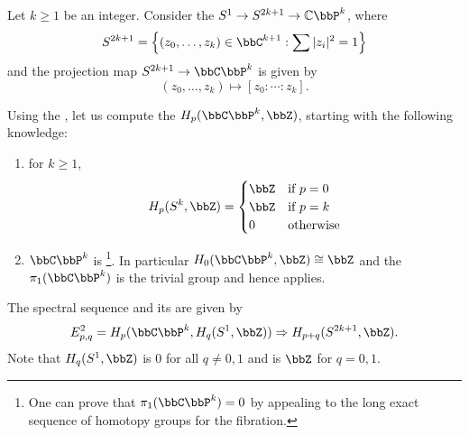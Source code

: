 \begin{example} \label{example:spectral_sequence_computation_of_singular_homology_of_complex_projective_space}
    Let $k \geq 1$ be an integer. Consider the  $S^1 \to S^{2k+1} \to \mathbb{C}\bbP^k$, where 
    $$S^{2k+1} = \left\{(z_0,\ldots,z_k) \in \bbC^{k+1} : \sum |z_i|^2 = 1 \right\}$$
    and the projection map $S^{2k+1} \to \bbC\bbP^k$ is given by 
    $$(z_0,\ldots,z_k) \mapsto [z_0:\cdots:z_k].$$

    Using the , let us compute the  $H_p(\bbC \bbP^k, \bbZ)$, starting with the following knowledge:
    \begin{enumerate}
        \item for $k \geq 1$, 
        \begin{align*}
            H_p(S^k, \bbZ) = \begin{cases} \bbZ &\text{if } p = 0 \\ \bbZ &\text{if } p = k \\ 0 &\text{otherwise} \end{cases}
        \end{align*}

        \item $\bbC\bbP^k$ is \footnote{One can prove that $\pi_1(\bbC\bbP^k) = 0$ by appealing to the long exact sequence of homotopy groups for the fibration.}. In particular $H_0(\bbC \bbP^k, \bbZ) \cong \bbZ$ and the  $\pi_1(\bbC \bbP^k)$ is the trivial group and hence  applies. 
    \end{enumerate}
    The spectral sequence and its  are given by
    $$E_{p,q}^2 = H_p(\bbC\bbP^k, H_q(S^1, \bbZ)) \Rightarrow H_{p+q}(S^{2k+1}, \bbZ).$$
    Note that $H_q(S^1, \bbZ)$ is $0$ for all $q \neq 0,1$ and is $\bbZ$ for $q = 0,1$. 


\end{example}
